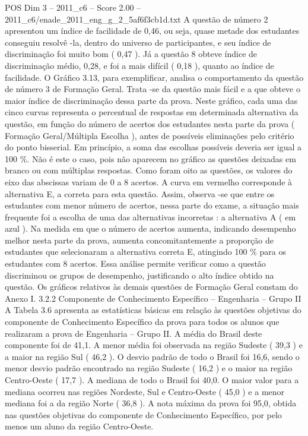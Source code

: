 \begin{textsample}{POS Dim 3 – 2011\_c6 – Score 2.00 – 2011\_c6/enade\_2011\_eng\_g\_2\_5af6f3cb1d.txt}
A questão de número 2 apresentou um índice de facilidade de 0,46, ou seja, quase metade dos estudantes conseguiu resolvê -la, dentro do universo de participantes, e seu índice de discriminação foi muito bom ( 0,47 ).
Já a questão 8 obteve índice de discriminação médio, 0,28, e foi a mais difícil ( 0,18 ), quanto ao índice de facilidade.
O Gráfico 3.13, para exemplificar, analisa o comportamento da questão de número 3 de Formação Geral.
Trata -se da questão mais fácil e a que obteve o maior índice de discriminação dessa parte da prova.
Neste gráfico, cada uma das cinco curvas representa o percentual de respostas em determinada alternativa da questão, em função do número de acertos dos estudantes nesta parte da prova ( Formação Geral/Múltipla Escolha ), antes de possíveis eliminações pelo critério do ponto bisserial.
Em princípio, a soma das escolhas possíveis deveria ser igual a 100 \%.
Não é este o caso, pois não aparecem no gráfico as questões deixadas em branco ou com múltiplas respostas.
Como foram oito as questões, os valores do eixo das abscissas variam de 0 a 8 acertos.
A curva em vermelho corresponde à alternativa E, a correta para esta questão.
Assim, observa -se que entre os estudantes com menor número de acertos, nessa parte do exame, a situação mais frequente foi a escolha de uma das alternativas incorretas : a alternativa A ( em azul ).
Na medida em que o número de acertos aumenta, indicando desempenho melhor nesta parte da prova, aumenta concomitantemente a proporção de estudantes que selecionaram a alternativa correta E, atingindo 100 \% para os estudantes com 8 acertos.
Essa análise permite verificar como a questão discriminou os grupos de desempenho, justificando o alto índice obtido na questão.
Os gráficos relativos às demais questões de Formação Geral constam do Anexo I. 3.2.2 Componente de Conhecimento Específico – Engenharia – Grupo II A Tabela 3.6 apresenta as estatísticas básicas em relação às questões objetivas do componente de Conhecimento Específico da prova para todos os alunos que realizaram a prova de Engenharia – Grupo II.
A média do Brasil deste componente foi de 41,1.
A menor média foi observada na região Sudeste ( 39,3 ) e a maior na região Sul ( 46,2 ).
O desvio padrão de todo o Brasil foi 16,6, sendo o menor desvio padrão encontrado na região Sudeste ( 16,2 ) e o maior na região Centro-Oeste ( 17,7 ).
A mediana de todo o Brasil foi 40,0.
O maior valor para a mediana ocorreu nas regiões Nordeste, Sul e Centro-Oeste ( 45,0 ) e a menor mediana foi a da região Norte ( 36,8 ).
A nota máxima da prova foi 95,0, obtida nas questões objetivas do componente de Conhecimento Específico, por pelo menos um aluno da região Centro-Oeste.

\end{textsample}
